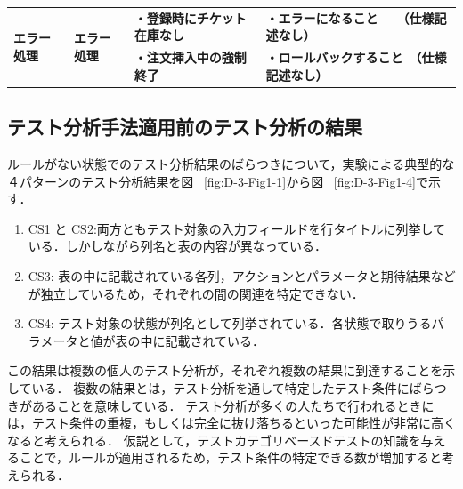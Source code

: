 \begin{table}[htbp]
\begin{tabular}{|l|l|p{13em}|p{18em}|}
    \hline
    \multicolumn{1}{|l|}{\multirow{2}[2]{*}{\textbf{エラー処理}}} & \multicolumn{1}{l|}{\multirow{2}[2]{*}{\textbf{エラー処理}}} & \textbf{・登録時にチケット在庫なし} & \textbf{・エラーになること　　（仕様記述なし）} \bigstrut[t]\\
          &       & \textbf{・注文挿入中の強制終了} & \textbf{・ロールバックすること　（仕様記述なし）} \bigstrut[b]\\
    \hline
    \end{tabular}%
  \label{tab:D-3-ensyu2}%
\end{table}%

\subsection{テスト分析手法適用前のテスト分析の結果}

ルールがない状態でのテスト分析結果のばらつきについて，実験による典型的な４パターンのテスト分析結果を図 ~\ref{fig:D-3-Fig1-1}から図 ~\ref{fig:D-3-Fig1-4}で示す．
\begin{enumerate}
\item CS1 と CS2:両方ともテスト対象の入力フィールドを行タイトルに列挙している．しかしながら列名と表の内容が異なっている．
\item CS3: 表の中に記載されている各列，アクションとパラメータと期待結果などが独立しているため，それぞれの間の関連を特定できない．
\item CS4: テスト対象の状態が列名として列挙されている．各状態で取りうるパラメータと値が表の中に記載されている．
\end{enumerate}

この結果は複数の個人のテスト分析が，それぞれ複数の結果に到達することを示している．
複数の結果とは，テスト分析を通して特定したテスト条件にばらつきがあることを意味している．
テスト分析が多くの人たちで行われるときには，テスト条件の重複，もしくは完全に抜け落ちるといった可能性が非常に高くなると考えられる．
仮説として，テストカテゴリベースドテストの知識を与えることで，ルールが適用されるため，テスト条件の特定できる数が増加すると考えられる．

